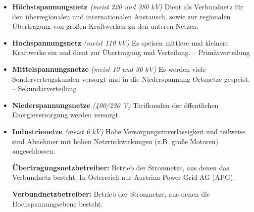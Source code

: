 \begin{itemize}
    \item \textbf{Höchstspannungsnetz} \textit{(meist 220 und 380 kV)}
    \newline Dient als Verbundnetz für den überregionalen und internationalen Austausch, sowie zur regionalen Übertragung von großen Kraftwerken zu den unteren Netzen.
    \item \textbf{Hochspannungsnetz} \textit{(meist 110 kV)}
    \newline Es speisen mittlere und kleinere Kraftwerke ein und dient zur Übertragung und Verteilung. – Primärverteilung
    \item \textbf{Mittelspannungsnetze} \textit{(meist 10 und 30 kV)}
    \newline Es werden viele Sondervertragskunden versorgt und in die Niederspannung-Ortsnetze gespeist. – Sekundärverteilung
    \item \textbf{Niederspannungsnetze} \textit{(400/230 V)}
    \newline Tarifkunden der öffentlichen Energieversorgung werden versorgt.
    \item \textbf{Industrienetze} \textit{(meist 6 kV)}
    \newline Hohe Versorgungszuverlässigkeit und teilweise sind Abnehmer mit hohen Netzrückwirkungen (z.B. große Motoren) angeschlossen.
\end{itemize}

\vspace{1em}


\vspace{2em}

\begin{itemize}
    \item[\textbf{Übertragungsnetzbetreiber:}] Betrieb der Stromnetze, aus denen das Verbundnetz besteht. In Österreich nur Austrian Power Grid AG (APG).
    \item[\textbf{Verbundnetzbetreiber:}] Betrieb der Stromnetze, aus denen die Hochspannungsebene besteht.
\end{itemize}

